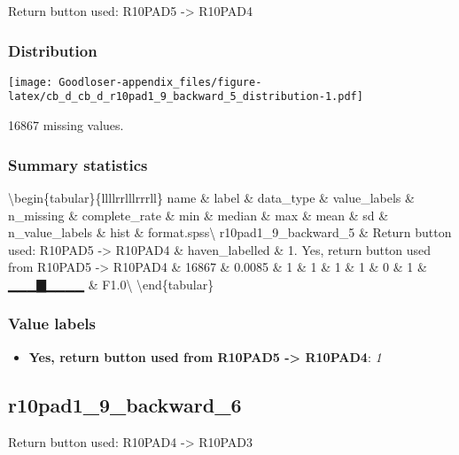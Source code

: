 \documentclass[
]{book}
\providecommand{\tightlist}{%
  \setlength{\itemsep}{0pt}\setlength{\parskip}{0pt}}
\begin{document}
Return button used: R10PAD5 -\textgreater{} R10PAD4

\hypertarget{r10pad1_9_backward_5_distribution}{%
\subsubsection{Distribution}\label{r10pad1_9_backward_5_distribution}}

\texttt{[image: Goodloser-appendix\_files/figure-latex/cb\_d\_cb\_d\_r10pad1\_9\_backward\_5\_distribution-1.pdf]}

16867 missing values.

\hypertarget{r10pad1_9_backward_5_summary}{%
\subsubsection{Summary statistics}\label{r10pad1_9_backward_5_summary}}

\textbackslash begin\{tabular\}\{l\textbar l\textbar l\textbar l\textbar r\textbar r\textbar l\textbar l\textbar l\textbar r\textbar r\textbar r\textbar l\textbar l\}
\hline
name \& label \& data\_type \& value\_labels \& n\_missing \& complete\_rate \& min \& median \& max \& mean \& sd \& n\_value\_labels \& hist \& format.spss\textbackslash{}
\hline
r10pad1\_9\_backward\_5 \& Return button used: R10PAD5 -\textgreater{} R10PAD4 \& haven\_labelled \& 1. Yes, return button used from R10PAD5 -\textgreater{} R10PAD4 \& 16867 \& 0.0085 \& 1 \& 1 \& 1 \& 1 \& 0 \& 1 \& ▁▁▁▇▁▁▁▁ \& F1.0\textbackslash{}
\hline
\textbackslash end\{tabular\}

\hypertarget{r10pad1_9_backward_5_labels}{%
\subsubsection{Value labels}\label{r10pad1_9_backward_5_labels}}

\begin{itemize}
\tightlist
\item
  \textbf{Yes, return button used from R10PAD5 -\textgreater{} R10PAD4}: \emph{1}
\end{itemize}

\hypertarget{r10pad1_9_backward_6}{%
\subsection{r10pad1\_9\_backward\_6}\label{r10pad1_9_backward_6}}

Return button used: R10PAD4 -\textgreater{} R10PAD3
\end{document}
